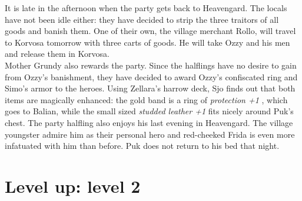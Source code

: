 It is late in the afternoon when the party gets back to Heavengard. The locals have not been idle either: they have decided to strip the three traitors of all goods and banish them. One of their own, the village merchant Rollo, will travel to Korvosa tomorrow with three carts of goods. He will take Ozzy and his men and release them in Korvosa.\\

Mother Grundy also rewards the party. Since the halflings have no desire to gain from Ozzy's banishment, they have decided to award Ozzy's confiscated ring and Simo's armor to the heroes. Using Zellara's harrow deck, Sjo finds out that both items are magically enhanced: the gold band is a ring of {\itshape protection +1} , which goes to Balian, while the small sized  {\itshape studded leather +1} fits nicely around Puk's chest. The party halfling also enjoys his last evening in Heavengard. The village youngster admire him as their personal hero and red-cheeked Frida is even more infatuated with him than before. Puk does not return to his bed that night.\\

\section{Level up: level 2}

